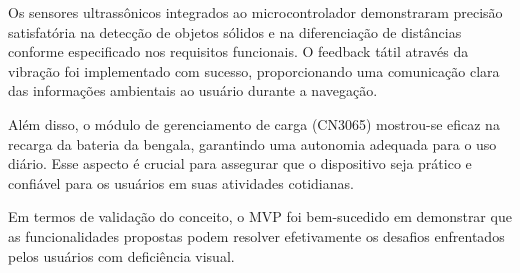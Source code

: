 Os sensores ultrassônicos integrados ao microcontrolador demonstraram precisão satisfatória na detecção de objetos sólidos e na diferenciação de distâncias conforme especificado nos requisitos funcionais. O feedback tátil através da vibração foi implementado com sucesso, proporcionando uma comunicação clara das informações ambientais ao usuário durante a navegação.

Além disso, o módulo de gerenciamento de carga (CN3065) mostrou-se eficaz na recarga da bateria da bengala, garantindo uma autonomia adequada para o uso diário. Esse aspecto é crucial para assegurar que o dispositivo seja prático e confiável para os usuários em suas atividades cotidianas.

Em termos de validação do conceito, o MVP foi bem-sucedido em demonstrar que as funcionalidades propostas podem resolver efetivamente os desafios enfrentados pelos usuários com deficiência visual. 
